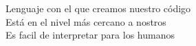 \documentclass[preview]{standalone}
\begin{document}
Lenguaje con el que creamos nuestro código\\Está en el nivel más cercano a nostros\\Es facil de interpretar para los humanos\\
\end{document}
